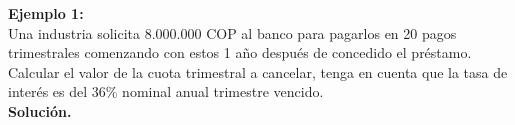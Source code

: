 \textbf{Ejemplo 1:}\\

Una industria solicita 8.000.000 COP al banco para pagarlos en 20 pagos trimestrales comenzando con estos 1 año después de concedido el préstamo. Calcular el valor de la cuota trimestral a cancelar, tenga en cuenta que la tasa de interés es del 36\% nominal anual trimestre vencido.\\


\textbf{Solución.}
